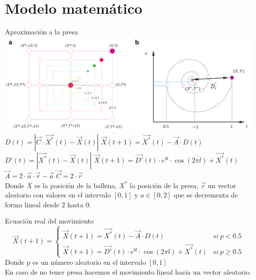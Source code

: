 \documentclass[10pt]{beamer}
\begin{document}
\section{Modelo matemático}

\begin{frame}[fragile]{Aproximación a la presa}
	\includegraphics[scale=0.23]{./Imagenes/imagen3.png}
	\pause
	\vspace{5px}
	$D(t) = |\vec{C}\cdot \vec{X^*}(t)-\vec{X}(t)|$ \hspace{20px} $\vec{X}(t+1) = \vec{X^*}(t)-\vec{A}\cdot D(t)$ \\
	\pause
	$D'(t) = |\vec{X^*}(t)-\vec{X}(t)|$ \hspace{20px} $\vec{X}(t+1) = \vec{D'}(t)\cdot e^{bl}\cdot \cos (2\pi l)+\vec{X^*}(t)$ \\
	\vspace{10px}
	$\vec{A} = 2\cdot \vec{a}\cdot \vec{r}-\vec{a}$ \hspace{20px} $\vec{C}=2\cdot \vec{r}$ \\
	\pause
	Donde $X$ es la posición de la ballena, $X^*$ la posición de la presa, $\vec{r}$ un vector aleatorio con valores en el intervalo $[0,1]$ y $a\in [0,2]$ que se decrementa de forma lineal desde 2 hasta 0.
\end{frame}

\begin{frame}[fragile]{Ecuación real del movimiento}
	\pause
	$$
	\vec{X}(t+1)=
	\begin{cases}
		\vec{X}(t+1) = \vec{X^*}(t)-\vec{A}\cdot D(t) & si \ p<0.5\\
		\vec{X}(t+1) = \vec{D'}(t)\cdot e^{bl}\cdot \cos (2\pi l)+\vec{X^*}(t) & si \ p \geq 0.5
	\end{cases}
	$$
	\pause
	Donde p es un número aleatorio en el intervalo $[0,1]$ \\
	\pause
	En caso de no tener presa hacemos el movimiento lineal hacia un vector aleatorio.
\end{frame}
\end{document}
